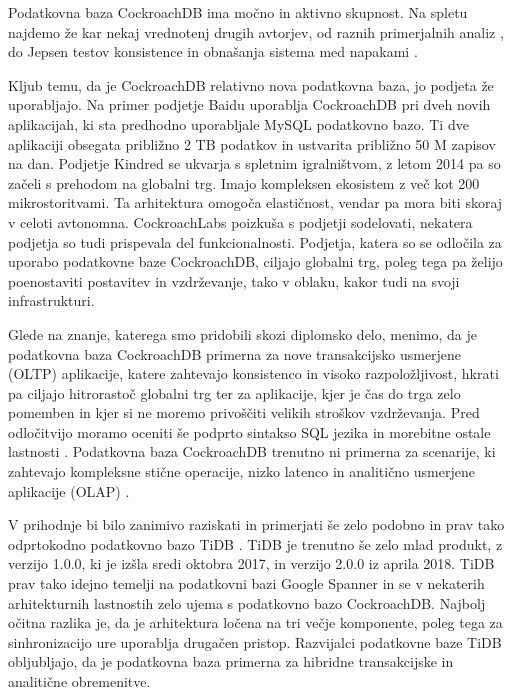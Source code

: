 \documentclass[a4paper, 12pt]{book}
\begin{document}
Podatkovna baza CockroachDB ima močno in aktivno skupnost. Na spletu najdemo že kar nekaj vrednotenj drugih avtorjev, od raznih primerjalnih analiz \cite{kaur2017performance, Benchmarking-GCS-CRDB-NuoDB, CRDB-tpcc-vs-aurora, CRDB-2017}, do Jepsen testov konsistence in obnašanja sistema med napakami \cite{CRDB-jepsen, CRDB-jepsen-diy}.

Kljub temu, da je CockroachDB relativno nova podatkovna baza, jo podjeta že uporabljajo. Na primer podjetje Baidu \cite{crdb-baidu} uporablja CockroachDB pri dveh novih aplikacijah, ki sta predhodno uporabljale MySQL podatkovno bazo. Ti dve aplikaciji obsegata približno 2 TB podatkov in ustvarita približno 50 M zapisov na dan. Podjetje Kindred \cite{crdb-kindred} se ukvarja s spletnim igralništvom, z letom 2014 pa so začeli s prehodom na globalni trg. Imajo kompleksen ekosistem z več kot 200 mikrostoritvami. Ta arhitektura omogoča elastičnost, vendar pa mora biti skoraj v celoti avtonomna. CockroachLabs poizkuša s podjetji sodelovati, nekatera podjetja so tudi prispevala del funkcionalnosti. Podjetja, katera so se odločila za uporabo podatkovne baze CockroachDB, ciljajo globalni trg, poleg tega pa želijo poenostaviti postavitev in vzdrževanje, tako v oblaku, kakor tudi na svoji infrastrukturi.

Glede na znanje, katerega smo pridobili skozi diplomsko delo, menimo, da je podatkovna baza CockroachDB primerna za nove transakcijsko usmerjene (OLTP) aplikacije, katere zahtevajo konsistenco in visoko razpoložljivost, hkrati pa ciljajo hitrorastoč globalni trg ter za aplikacije, kjer je čas do trga zelo pomemben in kjer si ne moremo privoščiti velikih stroškov vzdrževanja. Pred odločitvijo moramo oceniti še podprto sintakso SQL jezika \cite{CRDB-sql-features} in morebitne ostale lastnosti \cite{CRDB-limitations}. Podatkovna baza CockroachDB trenutno ni primerna za scenarije, ki zahtevajo kompleksne stične operacije, nizko latenco in analitično usmerjene aplikacije (OLAP) \cite{CRDB-FAQ}.

V prihodnje bi bilo zanimivo raziskati in primerjati še zelo podobno in prav tako odprtokodno podatkovno bazo TiDB \cite{PingCAP-home}. TiDB je trenutno še zelo mlad produkt, z verzijo 1.0.0, ki je izšla sredi oktobra 2017, in verzijo 2.0.0 iz aprila 2018. TiDB prav tako idejno temelji na podatkovni bazi Google Spanner in se v nekaterih arhitekturnih lastnostih zelo ujema s podatkovno bazo CockroachDB. Najbolj očitna razlika je, da je arhitektura ločena na tri večje komponente, poleg tega za sinhronizacijo ure uporablja drugačen pristop. Razvijalci podatkovne baze TiDB obljubljajo, da je podatkovna baza primerna za hibridne transakcijske in analitične obremenitve.
\end{document}
